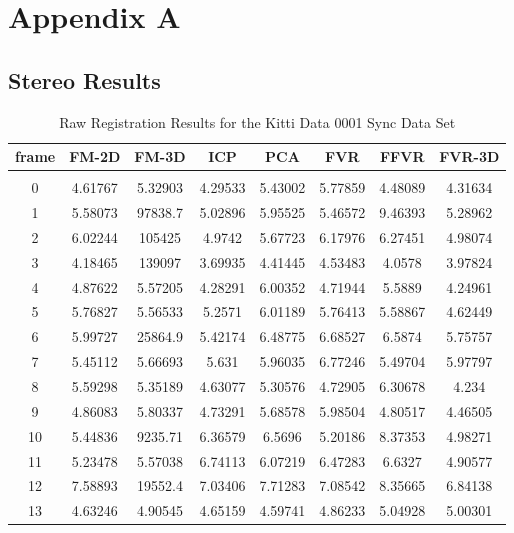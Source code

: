 \makeatletter
\chapter{Appendix A}
\label{RawQuantitative1}

\section{Stereo Results}
\label{StereoResultsRaw}

\begin{center}
\begin{longtable}{cccccccc}
\caption{Raw Registration Results for the Kitti Data 0001 Sync Data Set}\\
\label{tab:kittidata0001syncFULL}
\endfirsthead
\endhead
\textbf{frame} & \textbf{FM-2D} & \textbf{FM-3D} & \textbf{ICP} & \textbf{PCA} & \textbf{FVR} & \textbf{FFVR} & \textbf{FVR-3D} \\
\hline \\
0 & 4.61767 & 5.32903 & 4.29533 & 5.43002 & 5.77859 & 4.48089 & 4.31634\\
1 & 5.58073 & 97838.7 & 5.02896 & 5.95525 & 5.46572 & 9.46393 & 5.28962\\
2 & 6.02244 & 105425 & 4.9742 & 5.67723 & 6.17976 & 6.27451 & 4.98074\\
3 & 4.18465 & 139097 & 3.69935 & 4.41445 & 4.53483 & 4.0578 & 3.97824\\
4 & 4.87622 & 5.57205 & 4.28291 & 6.00352 & 4.71944 & 5.5889 & 4.24961\\
5 & 5.76827 & 5.56533 & 5.2571 & 6.01189 & 5.76413 & 5.58867 & 4.62449\\
6 & 5.99727 & 25864.9 & 5.42174 & 6.48775 & 6.68527 & 6.5874 & 5.75757\\
7 & 5.45112 & 5.66693 & 5.631 & 5.96035 & 6.77246 & 5.49704 & 5.97797\\
8 & 5.59298 & 5.35189 & 4.63077 & 5.30576 & 4.72905 & 6.30678 & 4.234\\
9 & 4.86083 & 5.80337 & 4.73291 & 5.68578 & 5.98504 & 4.80517 & 4.46505\\
10 & 5.44836 & 9235.71 & 6.36579 & 6.5696 & 5.20186 & 8.37353 & 4.98271\\
11 & 5.23478 & 5.57038 & 6.74113 & 6.07219 & 6.47283 & 6.6327 & 4.90577\\
12 & 7.58893 & 19552.4 & 7.03406 & 7.71283 & 7.08542 & 8.35665 & 6.84138\\
13 & 4.63246 & 4.90545 & 4.65159 & 4.59741 & 4.86233 & 5.04928 & 5.00301\\

\end{longtable}
\end{center}
